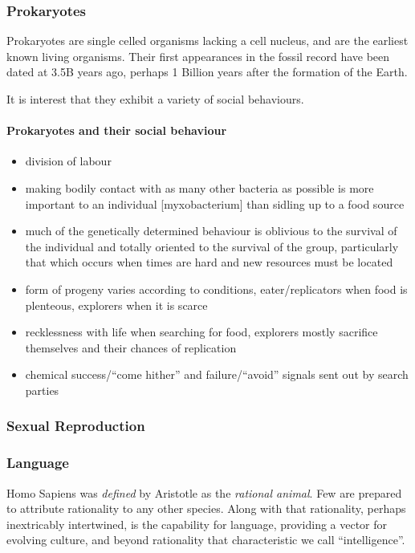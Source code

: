 \documentclass[10pt,titlepage]{book}
\begin{document}
\subsubsection {Prokaryotes}

Prokaryotes are single celled organisms lacking a cell nucleus, and are the earliest known living organisms.
Their first appearances in the fossil record have been dated at 3.5B years ago, perhaps 1 Billion years after the formation of the Earth. 


It is interest that they exhibit a variety of social behaviours.

\paragraph{Prokaryotes and their social behaviour}
  \begin{itemize}
  \item  division of labour
  \item making bodily contact with as many other bacteria as possible is more important to an individual [myxobacterium] than sidling up to a food source
  \item much of the genetically determined behaviour is oblivious to the survival of the individual and totally oriented to the survival of the group, particularly that which occurs when times are hard and new resources must be located
  \item form of progeny varies according to conditions, eater/replicators when food is plenteous, explorers when it is scarce
  \item recklessness with life when searching for food, explorers mostly sacrifice themselves and their chances of replication
  \item chemical success/``come hither'' and failure/``avoid'' signals sent out by search parties
    \end{itemize}

\subsubsection{Sexual Reproduction}

\subsubsection{Language}

Homo Sapiens was \emph{defined} by Aristotle as the \emph{rational animal}.
Few are prepared to attribute rationality to any other species.
Along with that rationality, perhaps inextricably intertwined, is the capability for language, providing a vector for evolving culture, and beyond rationality that characteristic we call ``intelligence''.
\end{document}

